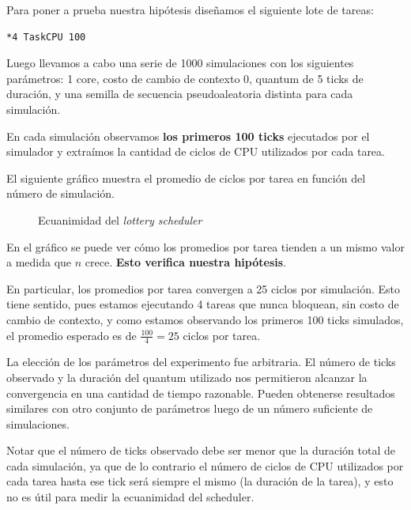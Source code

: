 \documentclass[a4paper,10pt,twoside]{article}
\begin{document}
Para poner a prueba nuestra hipótesis diseñamos el siguiente lote de tareas:

\begin{verbatim}
*4 TaskCPU 100
\end{verbatim}

Luego llevamos a cabo una serie de 1000 simulaciones con los siguientes parámetros: 1 core, costo de cambio de contexto 0, quantum de 5 ticks de duración, y una semilla de secuencia pseudoaleatoria distinta para cada simulación.

En cada simulación observamos \textbf{los primeros 100 ticks} ejecutados por el simulador y extraímos la cantidad de ciclos de CPU utilizados por cada tarea.

El siguiente gráfico muestra el promedio de ciclos por tarea en función del número de simulación.

\begin{figure}[H]
	\centering
	
	\caption{Ecuanimidad del \textit{lottery scheduler}}
\end{figure}

En el gráfico se puede ver cómo los promedios por tarea tienden a un mismo valor a medida que $n$ crece. \textbf{Esto verifica nuestra hipótesis}.

En particular, los promedios por tarea convergen a 25 ciclos por simulación. Esto tiene sentido, pues estamos ejecutando 4 tareas que nunca bloquean, sin costo de cambio de contexto, y como estamos observando los primeros 100 ticks simulados, el promedio esperado es de $\frac{100}{4} = 25$ ciclos por tarea.

La elección de los parámetros del experimento fue arbitraria. El número de ticks observado y la duración del quantum utilizado nos permitieron alcanzar la convergencia en una cantidad de tiempo razonable. Pueden obtenerse resultados similares con otro conjunto de parámetros luego de un número suficiente de simulaciones.

Notar que el número de ticks observado debe ser menor que la duración total de cada simulación, ya que de lo contrario el número de ciclos de CPU utilizados por cada tarea hasta ese tick será siempre el mismo (la duración de la tarea), y esto no es útil para medir la ecuanimidad del scheduler.


\end{document}
